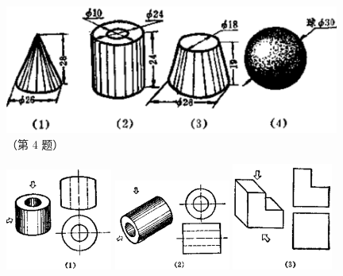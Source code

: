 \begin{xiaotis}

\begin{figure}[htbp]
    \centering
    \includegraphics[width=11cm]{../pic/czjh2-ch8-xiti29-04.png}
    \caption*{（第 4 题）}
\end{figure}


\begin{figure}[H]
    \centering
    \begin{minipage}[b]{4cm}
        \centering
        \includegraphics[width=3.5cm]{../pic/czjh2-ch8-xiti29-05-1.png}
    \end{minipage}
    \qquad
    \begin{minipage}[b]{4cm}
        \centering
        \includegraphics[width=3.8cm]{../pic/czjh2-ch8-xiti29-05-2.png}
    \end{minipage}
    \qquad
    \begin{minipage}[b]{4cm}
        \centering
        \includegraphics[width=3.3cm]{../pic/czjh2-ch8-xiti29-05-3.png}
    \end{minipage}
\end{figure} %


\end{xiaotis}
